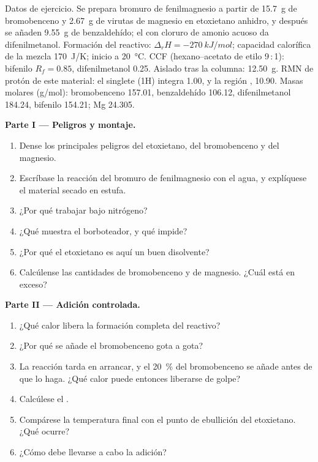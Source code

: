 \begin{problem}
\label{pb:b2:lab-techniques-2:1}
Datos de ejercicio. Se prepara bromuro de fenilmagnesio a partir de \qty{15.7}{g} de bromobenceno y \qty{2.67}{g} de
virutas de magnesio en etoxietano anhidro, y después se añaden \qty{9.55}{g} de benzaldehído; el  con
cloruro de amonio acuoso da difenilmetanol. Formación del reactivo: $\Delta_rH =
\qty{-270}{kJ/mol}$; capacidad calorífica de la mezcla \qty{170}{J/K}; inicio a \qty{20}{\degreeCelsius}. CCF
(hexano--acetato de etilo 9\,:\,1): bifenilo $R_f = 0.85$, difenilmetanol 0.25. Aislado tras la columna:
\qty{12.50}{g}. RMN de protón de este material: el singlete  (1H) integra 1.00, y la región
, 10.90. Masas molares (\unit{g/mol}): bromobenceno 157.01, benzaldehído 106.12, difenilmetanol
184.24, bifenilo 154.21; Mg 24.305.

\medskip
\noindent\textbf{Parte I --- Peligros y montaje.}
\begin{enumerate}
  \item Dense los principales peligros del etoxietano, del bromobenceno y del magnesio.
  \item Escríbase la reacción del bromuro de fenilmagnesio con el agua, y explíquese el material secado en estufa.
  \item ¿Por qué trabajar bajo nitrógeno?
  \item ¿Qué muestra el borboteador, y qué impide?
  \item ¿Por qué el etoxietano es aquí un buen disolvente?
  \item Calcúlense las cantidades de bromobenceno y de magnesio. ¿Cuál está en exceso?
\end{enumerate}

\medskip
\noindent\textbf{Parte II --- Adición controlada.}
\begin{enumerate}[resume]
  \item ¿Qué calor libera la formación completa del reactivo?
  \item ¿Por qué se añade el bromobenceno gota a gota?
  \item La reacción tarda en arrancar, y el 20~\% del bromobenceno se añade antes de que lo haga. ¿Qué calor
        puede entonces liberarse de golpe?
  \item Calcúlese el .
  \item Compárese la temperatura final con el punto de ebullición del etoxietano. ¿Qué ocurre?
  \item ¿Cómo debe llevarse a cabo la adición?
\end{enumerate}


\end{problem}

